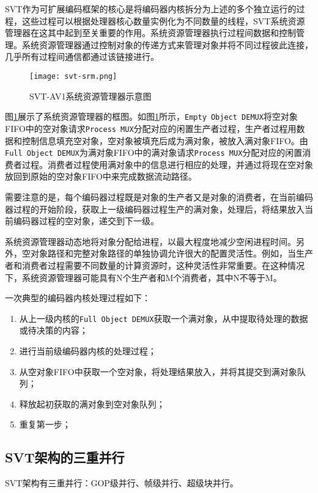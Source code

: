   SVT作为可扩展编码框架的核心是将编码器内核拆分为上述的多个独立运行的过程，这些过程可以根据处理器核心数量实例化为不同数量的线程，SVT系统资源管理器在这其中起到至关重要的作用。系统资源管理器执行过程间数据和控制管理。系统资源管理器通过控制对象的传递方式来管理对象并将不同过程彼此连接，几乎所有过程间通信都通过该链接进行。

  \begin{figure}[!htp]
    \centering
    \texttt{[image: svt-srm.png]}
    \caption{SVT-AV1系统资源管理器示意图\cite{EncoderDesignSVTAV1}}
  \label{fig:svt-srm}
  \end{figure}

  图\ref{fig:svt-srm}展示了系统资源管理器的框图。如图\ref{fig:svt-srm}所示，\texttt{Empty Object DEMUX}将空对象FIFO中的空对象请求\texttt{Process MUX}分配对应的闲置生产者过程，生产者过程用数据和控制信息填充空对象，空对象被填充后成为满对象，被放入满对象FIFO。由\texttt{Full Object DEMUX}为满对象FIFO中的满对象请求\texttt{Process MUX}分配对应的闲置消费者过程。消费者过程使用满对象中的信息进行相应的处理，并通过将现在空对象放回到原始的空对象FIFO中来完成数据流动路径。

  需要注意的是，每个编码器过程既是对象的生产者又是对象的消费者，在当前编码器过程的开始阶段，获取上一级编码器过程生产的满对象，处理后，将结果放入当前编码器过程的空对象，递交到下一级。

  系统资源管理器动态地将对象分配给进程，以最大程度地减少空闲进程时间。另外，空对象路径和完整对象路径的单独协调允许很大的配置灵活性。例如，当生产者和消费者过程需要不同数量的计算资源时，这种灵活性非常重要。在这种情况下，系统资源管理器可能具有N个生产者和M个消费者，其中N不等于M。

  一次典型的编码器内核处理过程如下：
  \begin{enumerate} [label=\arabic*)]
    \item 从上一级内核的\texttt{Full Object DEMUX}获取一个满对象，从中提取待处理的数据或待决策的内容；
    \item 进行当前级编码器内核的处理过程；
    \item 从空对象FIFO中获取一个空对象，将处理结果放入，并将其提交到满对象队列；
    \item 释放起初获取的满对象到空对象队列；
    \item 重复第一步；
  \end{enumerate}

  \subsection{SVT架构的三重并行}
  SVT架构有三重并行：GOP级并行、帧级并行、超级块并行。
